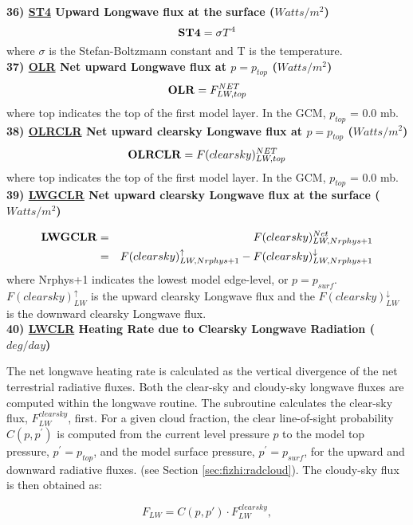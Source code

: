  
\noindent
{\bf 36)  \underline {ST4} Upward Longwave flux at the surface ($Watts/m^2$) }
\[
{\bf ST4} = \sigma T^4
\]
\noindent
where $\sigma$ is the Stefan-Boltzmann constant and T is the temperature.
\\
 
\noindent
{\bf 37)  \underline {OLR} Net upward Longwave flux at $p=p_{top}$ ($Watts/m^2$) }
\[
{\bf OLR}  =  F_{LW,top}^{NET}
\]
\noindent
where top indicates the top of the first model layer.
In the GCM, $p_{top}$ = 0.0 mb.
\\


\noindent
{\bf 38)  \underline {OLRCLR} Net upward clearsky Longwave flux at $p=p_{top}$ ($Watts/m^2$) }
\[
{\bf OLRCLR}  =  F(clearsky)_{LW,top}^{NET}
\]
\noindent
where top indicates the top of the first model layer.
In the GCM, $p_{top}$ = 0.0 mb.
\\

\noindent
{\bf 39)  \underline {LWGCLR} Net upward clearsky Longwave flux at the surface ($Watts/m^2$) }

\noindent
\begin{eqnarray*}
{\bf LWGCLR} & =  & F(clearsky)_{LW,Nrphys+1}^{Net} \\
             & =  & F(clearsky)_{LW,Nrphys+1}^\uparrow - F(clearsky)_{LW,Nrphys+1}^\downarrow
\end{eqnarray*}
where Nrphys+1 indicates the lowest model edge-level, or $p = p_{surf}$.
$F(clearsky)_{LW}^\uparrow$ is
the upward clearsky Longwave flux and the $F(clearsky)_{LW}^\downarrow$ is the downward clearsky Longwave flux.
\\

\noindent
{\bf 40)  \underline {LWCLR} Heating Rate due to Clearsky Longwave Radiation ($deg/day$) }

\noindent
The net longwave heating rate is calculated as the vertical divergence of the
net terrestrial radiative fluxes.
Both the clear-sky and cloudy-sky longwave fluxes are computed within the
longwave routine.
The subroutine calculates the clear-sky flux, $F^{clearsky}_{LW}$, first.
For a given cloud fraction,
the clear line-of-sight probability $C(p,p^{\prime})$ is computed from the current level pressure $p$ 
to the model top pressure, $p^{\prime} = p_{top}$, and the model surface pressure, $p^{\prime} = p_{surf}$,
for the upward and downward radiative fluxes.
(see Section \ref{sec:fizhi:radcloud}).
The cloudy-sky flux is then obtained as:
   
\noindent
\[
F_{LW} = C(p,p') \cdot F^{clearsky}_{LW},
\]

